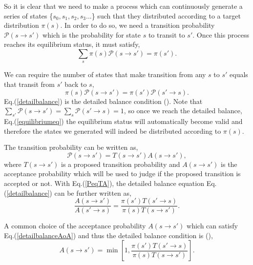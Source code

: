 \documentclass[12pt,letterpaper,UTF8]{report}
\begin{document}
So it is clear that we need to make a process which can continuously generate a series of states \{$s_0,s_1,s_2,s_3$...\} such that they distributed according to a target distribution $\pi(s)$. In order to do so, we need a transition probability $\mathcal{P}(s\rightarrow s')$ which is the probability for state $s$ to transit to $s'$. Once this process reaches its equilibrium status, it must satisfy,
\begin{equation}
\sum_s \pi(s) \mathcal{P}(s\rightarrow s')=\pi(s').
\label{equilibriumeq}
\end{equation}

We can require the number of states that make transition from any $s$ to $s'$ equals that transit from $s'$ back to $s$,
\begin{equation}
\pi(s) \mathcal{P}(s\rightarrow s')=\pi(s') \mathcal{P}(s'\rightarrow s).
\label{detailbalance}
\end{equation}
Eq.(\ref{detailbalance}) is the detailed balance condition (\cite{Ceperley95a}). Note that $\sum_{s'} \mathcal{P}(s\rightarrow s')=\sum_{s} \mathcal{P}(s'\rightarrow s)=1$, so once we reach the detailed balance, Eq.(\ref{equilibriumeq}) the equilibrium status will automatically become valid and therefore the states we generated will indeed be distributed according to $\pi(s)$.

The transition probability can be written as,
\begin{equation}
\mathcal{P}(s\rightarrow s')=T(s\rightarrow s') A(s\rightarrow s'),
\label{PeqTA}
\end{equation}
where $T(s\rightarrow s')$ is a proposed transition probability and $A(s\rightarrow s')$ is the acceptance probability which will be used to judge if the proposed transition is accepted or not. With Eq.(\ref{PeqTA}), the detailed balance equation Eq.(\ref{detailbalance}) can be further written as,
\begin{equation}
\frac{A(s\rightarrow s')}{A(s'\rightarrow s)}=\frac{\pi(s')T(s'\rightarrow s)}{\pi(s) T(s\rightarrow s') } .
\label{detailbalanceAoA}
\end{equation}

A common choice of the acceptance probability $A(s\rightarrow s')$ which can satisfy Eq.(\ref{detailbalanceAoA}) and thus the detailed balance condition is (\cite{Kalos1986a}),
\begin{equation}
A(s\rightarrow s')=
\min \left[  1, \frac{\pi(s')T(s'\rightarrow s)}{\pi(s) T(s\rightarrow s')} \right] .
\label{Accptequation}
\end{equation}
\end{document}
